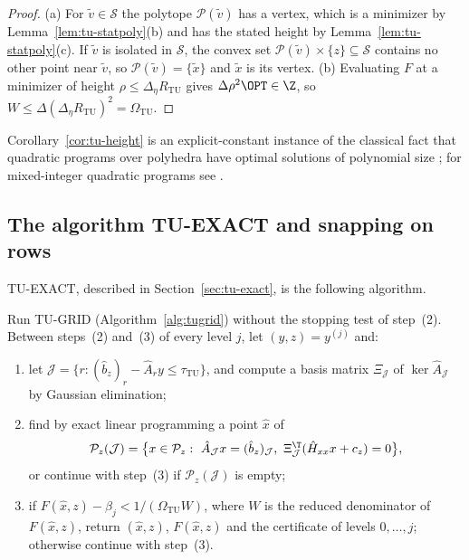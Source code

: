\begin{proof}
(a) For $\tilde v\in\mathcal S$ the polytope $\mathcal P(\tilde v)$ has a
vertex, which is a minimizer by Lemma~\ref{lem:tu-statpoly}(b) and has the
stated height by Lemma~\ref{lem:tu-statpoly}(c). If $\tilde v$ is isolated in
$\mathcal S$, the convex set $\mathcal P(\tilde v)\times\{z\}\subseteq\mathcal S$
contains no other point near $\tilde v$, so $\mathcal P(\tilde v)=\{\tilde x\}$
and $\tilde x$ is its vertex.
(b) Evaluating $F$ at a minimizer of height $\rho\le\Delta_\eta R_{\mathrm{TU}}$
gives $\Delta\rho^2\OPT\in\Z$, so $W\le\Delta(\Delta_\eta R_{\mathrm{TU}})^2=\Omega_{\mathrm{TU}}$.
\end{proof}

Corollary~\ref{cor:tu-height} is an explicit-constant instance of the
classical fact that quadratic programs over polyhedra have optimal solutions
of polynomial size \cite{Vavasis1990}; for mixed-integer quadratic programs see
\cite{DelPiaDeyMolinaro2017}.

\subsection{The algorithm TU-EXACT and snapping on rows}\label{app:tu-snap}

TU-EXACT, described in Section~\ref{sec:tu-exact}, is the following algorithm.

\begin{algorithm}\label{alg:tuexact}
Run TU-GRID (Algorithm~\ref{alg:tugrid}) without the stopping test of
step~(2). Between steps~(2) and~(3) of every level $j$, let $(y,z)=y^{(j)}$
and:
\begin{enumerate}[label=(\roman*)]
\item let $\mathcal J=\{r:(\hat b_z)_r-\hat A_ry\le\tau_{\mathrm{TU}}\}$, and
compute a basis matrix $\Xi_{\mathcal J}$ of $\ker\hat A_{\mathcal J}$ by
Gaussian elimination;
\item find by exact linear programming a point $\hat x$ of
\[
\mathcal P_z(\mathcal J)=\bigl\{x\in\mathcal P_z:\
\hat A_{\mathcal J}x=(\hat b_z)_{\mathcal J},\
\Xi_{\mathcal J}^{\T}(\hat H_{xx}x+c_z)=0\bigr\},
\]
or continue with step~(3) if $\mathcal P_z(\mathcal J)$ is empty;
\item if $F(\hat x,z)-\beta_j<1/(\Omega_{\mathrm{TU}}W)$, where $W$ is the
reduced denominator of $F(\hat x,z)$, return $(\hat x,z)$, $F(\hat x,z)$ and
the certificate of levels $0,\dots,j$; otherwise continue with step~(3).
\end{enumerate}
\end{algorithm}

